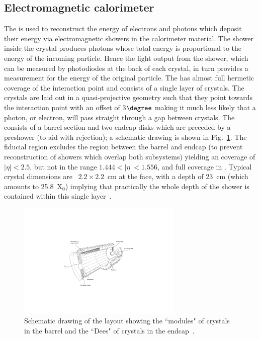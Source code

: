 \subsection{Electromagnetic calorimeter}
\label{sec:ecal}
The \ECAL is used to reconstruct the energy of electrons and photons which deposit their energy via electromagnetic showers in the calorimeter material. The shower inside the crystal produces photons whose total energy is proportional to the energy of the incoming particle. Hence the light output from the shower, which can be measured by photodiodes at the back of each crystal, in turn provides a measurement for the energy of the original particle. The \ECAL has almost full hermetic coverage of the interaction point and consists of a single layer of \PbWO crystals. The crystals are laid out in a quasi-projective geometry such that they point towards the interaction point with an offset of 3$\degree$ making it much less likely that a photon, or electron, will pass straight through a gap between crystals. The \ECAL consists of a barrel section and two endcap disks which are preceded by a preshower (to aid with \pizero rejection); a schematic drawing is shown in Fig.~\ref{fig:cms_ecal}. The fiducial region excludes the region between the barrel and endcap (to prevent reconstruction of showers which overlap both subsystems) yielding an \ECAL coverage of $|\eta|<2.5$, but not in the range $1.444<|\eta|<1.556$, and full coverage in \phi. Typical crystal dimensions are ~$2.2\times 2.2$~cm at the \ECAL face, with a depth of 23~cm (which amounts to 25.8~X$_{0}$) implying that practically the whole depth of the shower is contained within this single layer~\cite{ecal_project}. 
\begin{figure}
  \includegraphics[width=0.7\textwidth]{cms_experiment/plots/cmsecal.pdf}
  \caption[\acs{CMS} \acs{ECAL} schematic]{Schematic drawing of the \CMS \ECAL layout showing the ``modules" of crystals in the \ECAL barrel and the ``Dees" of crystals in the \ECAL endcap~\cite{CMS_JINST}.}
  \label{fig:cms_ecal}
\end{figure}

